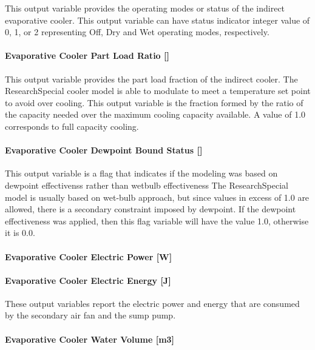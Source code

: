 This output variable provides the operating modes or status of the indirect evaporative cooler. This output variable can have status indicator integer value of 0, 1, or 2 representing Off, Dry and Wet operating modes, respectively.

\paragraph{Evaporative Cooler Part Load Ratio {[]}}\label{evaporative-cooler-part-load-ratio}

This output variable provides the part load fraction of the indirect cooler. The ResearchSpecial cooler model is able to modulate to meet a temperature set point to avoid over cooling. This output variable is the fraction formed by the ratio of the capacity needed over the maximum cooling capacity available. A value of 1.0 corresponds to full capacity cooling.

\paragraph{Evaporative Cooler Dewpoint Bound Status {[]}}\label{evaporative-cooler-dewpoint-bound-status}

This output variable is a flag that indicates if the modeling was based on dewpoint effectivenss rather than wetbulb effectiveness The ResearchSpecial model is usually based on wet-bulb approach, but since values in excess of 1.0 are allowed, there is a secondary constraint imposed by dewpoint. If the dewpoint effectiveness was applied, then this flag variable will have the value 1.0, otherwise it is 0.0.

\paragraph{Evaporative Cooler Electric Power {[}W{]}}\label{evaporative-cooler-electric-power-w-1}

\paragraph{Evaporative Cooler Electric Energy {[}J{]}}\label{evaporative-cooler-electric-energy-j-4}

These output variables report the electric power and energy that are consumed by the secondary air fan and the sump pump.

\paragraph{Evaporative Cooler Water Volume {[}m3{]}}\label{evaporative-cooler-water-volume-m3-3}

